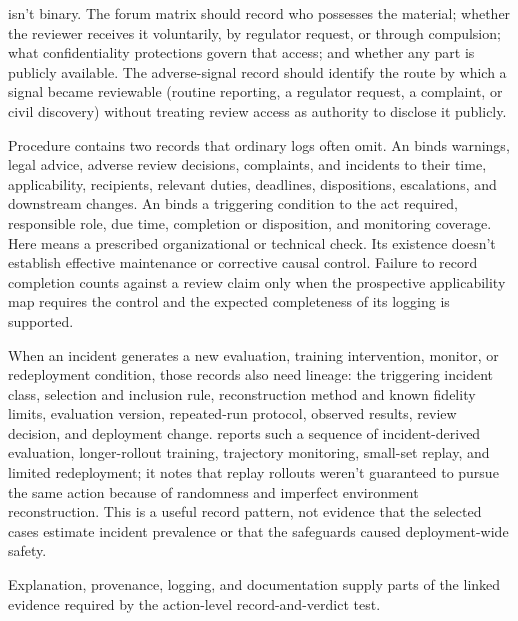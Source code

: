  isn't binary. The forum matrix should record who possesses the material; whether the reviewer receives it voluntarily, by regulator request, or through compulsion; what confidentiality protections govern that access; and whether any part is publicly available. The adverse-signal record should identify the route by which a signal became reviewable (routine reporting, a regulator request, a complaint, or civil discovery) without treating review access as authority to disclose it publicly.

Procedure contains two records that ordinary logs often omit. An  binds warnings, legal advice, adverse review decisions, complaints, and incidents to their time, applicability, recipients, relevant duties, deadlines, dispositions, escalations, and downstream changes. An  binds a triggering condition to the act required, responsible role, due time, completion or disposition, and monitoring coverage. Here  means a prescribed organizational or technical check. Its existence doesn't establish effective maintenance or corrective causal control. Failure to record completion counts against a review claim only when the prospective applicability map requires the control and the expected completeness of its logging is supported.

When an incident generates a new evaluation, training intervention, monitor, or redeployment condition, those records also need lineage: the triggering incident class, selection and inclusion rule, reconstruction method and known fidelity limits, evaluation version, repeated-run protocol, observed results, review decision, and deployment change. \textcite{openai2026longHorizonSafety} reports such a sequence of incident-derived evaluation, longer-rollout training, trajectory monitoring, small-set replay, and limited redeployment; it notes that replay rollouts weren't guaranteed to pursue the same action because of randomness and imperfect environment reconstruction. This is a useful record pattern, not evidence that the selected cases estimate incident prevalence or that the safeguards caused deployment-wide safety.

Explanation, provenance, logging, and documentation supply parts of the linked evidence required by the action-level record-and-verdict test.
